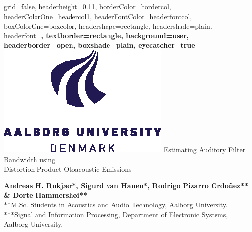 \documentclass[paperwidth=100cm,paperheight=160cm,portrait,fontscale=0.2941]{baposter}
\begin{document}
\graphicspath{{Pictures/}}
\background{ %

}

\begin{poster}{
grid=false,
headerheight=0.11\textheight,
borderColor=bordercol, %
headerColorOne=headercol1, %
headerFontColor=headerfontcol, %
boxColorOne=boxcolor, %
headershape=rectangle, %
headershade=plain,
headerfont=\Large\sf\bf, %
textborder=rectangle,
background=user,
headerborder=open, %
boxshade=plain,
eyecatcher=true
}
%
%
{
\includegraphics[height=0.06\textheight]{aau_logo_new.eps}
} %
{\vspace{2pt}
Estimating Auditory Filter Bandwidth using \\
Distortion Product Otoacoustic Emissions}
{
\vspace{3pt}
\normalsize{\textbf{Andreas H. Rukjær*, Sigurd van Hauen*, Rodrigo Pizarro Ordoñez** \& Dorte Hammershøi**}\\
**M.Sc. Students in Acoustics and Audio Technology, Aalborg University.\\ ***Signal and Information Processing, Department of Electronic Systems, Aalborg University.}

}
\end{poster}
\end{document}
